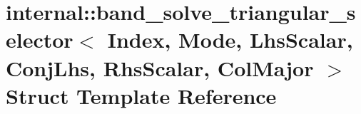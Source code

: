 \hypertarget{structinternal_1_1band__solve__triangular__selector_3_01_index_00_01_mode_00_01_lhs_scalar_00_0137de00cf99d429d0f5d51514cfce90a6}{}\section{internal\+:\+:band\+\_\+solve\+\_\+triangular\+\_\+selector$<$ Index, Mode, Lhs\+Scalar, Conj\+Lhs, Rhs\+Scalar, Col\+Major $>$ Struct Template Reference}
\label{structinternal_1_1band__solve__triangular__selector_3_01_index_00_01_mode_00_01_lhs_scalar_00_0137de00cf99d429d0f5d51514cfce90a6}
